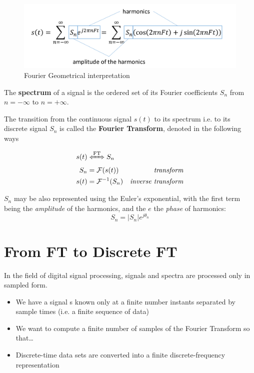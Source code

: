 \begin{figure}[htbp]
   \centering
   \includegraphics{images/fourier_geometric.png}
   \caption{Fourier Geometrical interpretation}
   \label{fig:fourier_geometric}
\end{figure}

\begin{definition}
   The \textbf{spectrum} of a signal is the ordered set of its Fourier coefficients $S_n$ from $n = -\infty$ to $n = +\infty$.
\end{definition}

\begin{definition}
   The transition from the continuous signal $s(t)$ to its spectrum i.e. to its discrete signal $S_n$ is called the \textbf{Fourier Transform}, denoted in the following ways

   \begin{align}
      s(t) & \xLeftrightarrow{\text{FT}} S_n\\
      S_n & = \mathcal{F}(s(t)) & \textit{transform}\\
      s(t) & = \mathcal{F}^{-1}(S_n) & \textit{inverse transform}
   \end{align}
\end{definition}

$S_n$ may be also represented using the Euler's exponential, with the first term being the \textit{amplitude} of the harmonics, and the $e$ the \textit{phase} of harmonics:
\begin{equation}
   S_n=|S_n|e^{j\theta_n}
\end{equation}

\section{From FT to Discrete FT}
In the field of digital signal processing, signals and spectra are processed only in sampled form.
\begin{itemize}
   \item We have a signal s known only at a finite number instants separated by sample times (i.e. a finite sequence of data)
   \item We want to compute a finite number of samples of the Fourier Transform so that\dots
   \item Discrete-time data sets are converted into a finite discrete-frequency representation
\end{itemize}

